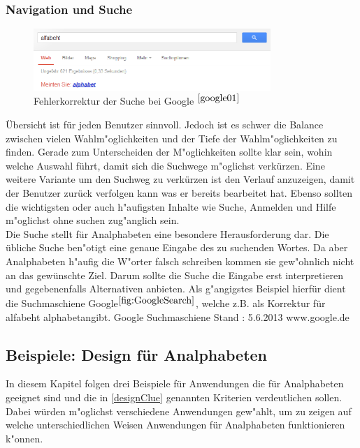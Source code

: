 \subsubsection{Navigation und Suche}
\begin{figure}[h]
	\centering
		\includegraphics[width=0.80\textwidth]{Daten/rechtschreibung.png}
	\caption{Fehlerkorrektur der Suche bei Google $^{\ref{google01}}$}
	\label{fig:GoogleSearch}
\end{figure}

Übersicht ist für jeden Benutzer sinnvoll. Jedoch ist es schwer die Balance zwischen vielen Wahlm"oglichkeiten und der Tiefe der Wahlm"oglichkeiten zu finden. Gerade zum Unterscheiden der M"oglichkeiten sollte klar sein, wohin welche Auswahl führt, damit sich
 die Suchwege m"oglichst verkürzen. Eine weitere Variante um den Suchweg zu verkürzen ist den Verlauf anzuzeigen, damit der Benutzer zurück verfolgen kann was er bereits bearbeitet hat. Ebenso sollten die wichtigsten oder auch h"aufigsten Inhalte wie Suche, Anmelden und Hilfe m"oglichst ohne suchen zug"anglich sein.\\
Die Suche stellt für Analphabeten eine besondere Herausforderung dar. Die übliche Suche ben"otigt eine genaue Eingabe des zu suchenden Wortes. Da aber Analphabeten h"aufig die W"orter falsch schreiben kommen sie gew"ohnlich nicht an das gewünschte Ziel. Darum sollte die Suche die Eingabe erst interpretieren und gegebenenfalls Alternativen anbieten.
Als g"angigstes Beispiel hierfür dient die Suchmaschiene Google$^{\ref{fig:GoogleSearch}}$, welche z.B. als Korrektur für \glqq alfabeht \grqq \glqq alphabet\grqq angibt.
						{Google Suchmaschiene}
						{Stand : 5.6.2013}
						{www.google.de}

\subsection{Beispiele: Design für Analphabeten}
In diesem Kapitel folgen drei Beispiele für Anwendungen die für Analphabeten geeignet sind und die in \ref{designClue} genannten Kriterien verdeutlichen sollen. Dabei würden m"oglichst verschiedene Anwendungen gew"ahlt, um zu zeigen auf welche unterschiedlichen Weisen Anwendungen für Analphabeten funktionieren k"onnen.

